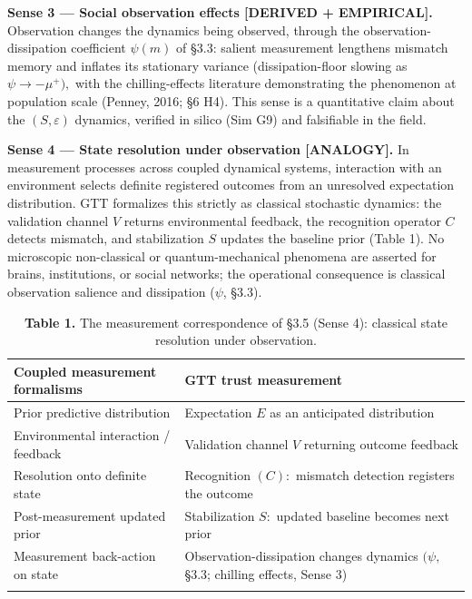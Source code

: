 \documentclass[11pt,twocolumn]{article}
\theoremstyle{gttdef}
\theoremstyle{gttplain}
\begin{document}
\textbf{Sense 3 --- Social observation effects [DERIVED + EMPIRICAL].} Observation changes the dynamics being observed, through the observation-dissipation coefficient $\psi(m)$ of \S{}3.3: salient measurement lengthens mismatch memory and inflates its stationary variance (dissipation-floor slowing as $\psi \to -\mu^{+}),$ with the chilling-effects literature demonstrating the phenomenon at population scale (Penney, 2016; \S{}6 H4). This sense is a quantitative claim about the $(S, \varepsilon)$ dynamics, verified in silico (Sim G9) and falsifiable in the field.

\textbf{Sense 4 --- State resolution under observation [ANALOGY].} In measurement processes across coupled dynamical systems, interaction with an environment selects definite registered outcomes from an unresolved expectation distribution. GTT formalizes this strictly as classical stochastic dynamics: the validation channel $V$ returns environmental feedback, the recognition operator $C$ detects mismatch, and stabilization $S$ updates the baseline prior (Table 1). No microscopic non-classical or quantum-mechanical phenomena are asserted for brains, institutions, or social networks; the operational consequence is classical observation salience and dissipation ($\psi$, \S{}3.3).

\begin{table}[!tb]
\centering\footnotesize
\caption*{\textbf{Table 1.} The measurement correspondence of \S 3.5 (Sense 4): classical state resolution under observation.}
\begin{tabular}{@{}>{\raggedright\arraybackslash}p{}>{\raggedright\arraybackslash}p{}@{}}
\toprule
\textbf{Coupled measurement formalisms} & \textbf{GTT trust measurement} \\
\midrule
Prior predictive distribution & Expectation $E$ as an anticipated distribution \\
\addlinespace[2pt]
Environmental interaction / feedback & Validation channel $V$ returning outcome feedback \\
\addlinespace[2pt]
Resolution onto definite state & Recognition $(C):$ mismatch detection registers the outcome \\
\addlinespace[2pt]
Post-measurement updated prior & Stabilization $S:$ updated baseline becomes next prior \\
\addlinespace[2pt]
Measurement back-action on state & Observation-dissipation changes dynamics $(\psi,$ \S{}3.3; chilling effects, Sense 3) \\
\addlinespace[2pt]
\bottomrule
\end{tabular}
\end{table}
\end{document}
